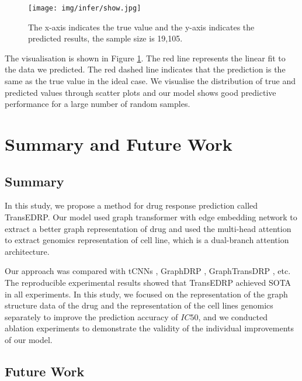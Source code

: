 \documentclass{article}
\begin{document}
\begin{figure}  \centering
\texttt{[image: img/infer/show.jpg]} 
\caption{The x-axis indicates the true value and the y-axis indicates the predicted results, the sample size is 19,105. }
\label{fig:showtest}
\end{figure}
The visualisation is shown in Figure \ref{fig:showtest}. The red line represents the linear fit to the data we predicted.
The red dashed line indicates that the prediction is the same as the true value in the ideal case.
We visualise the distribution of true and predicted values through scatter plots and our model shows good predictive performance for a large number of random samples.














\section{Summary and Future Work}

\subsection{Summary}
In this study, we propose a method for drug response prediction called TransEDRP. Our model used graph transformer with edge embedding network to extract a better graph representation of drug and used the multi-head attention to extract  genomics representation of cell line, which is a dual-branch attention architecture.

Our approach was compared with tCNNs \cite{tcnns}, GraphDRP \cite{110bGCNforDRP}, GraphTransDRP \cite{GraTransDRP}, etc. The reproducible experimental results showed that TransEDRP achieved SOTA in all experiments. In this study, we focused on the representation of the graph structure data of the drug and the representation of the cell lines genomics separately to improve the prediction accuracy of $IC50$, and we conducted ablation experiments to demonstrate the validity of the individual improvements of our model.



\subsection{Future Work}
\end{document}
